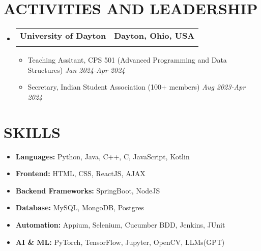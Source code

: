 \documentclass[letterpaper,11pt]{article}
\makeatletter
\newcommand{\resumeItem}[1]{\item\small{{#1 \vspace{-3pt}}}}
\newcommand{\resumeSubheading}[4]{\vspace{-2pt}\item\begin{tabular*}{0.97\textwidth}[t]{l@{\extracolsep{\fill}}r}\textbf{#1} & #2 \\\textit{\small#3} & \textit{\small #4} \\\end{tabular*}\vspace{-7pt}}
\newcommand{\resumeSubHeadingListStart}{\begin{itemize}[leftmargin=0.15in, label={}]}
\newcommand{\resumeSubHeadingListEnd}{\end{itemize}}
\newcommand{\resumeItemListStart}{\begin{itemize}}
\newcommand{\resumeItemListEnd}{\end{itemize}\vspace{-5pt}}
\makeatother
\begin{document}
\section{{\fontsize{9pt}{20pt}\selectfont \textbf{ACTIVITIES AND LEADERSHIP}}}
\resumeSubHeadingListStart
\resumeSubheading{University of Dayton}{\textbf{Dayton, Ohio, USA}}{}{}
\vspace{-17pt}
\resumeItemListStart
\resumeItem{Teaching Assitant, CPS 501 (Advanced Programming and Data Structures)} \hfill \textit{Jan 2024-Apr 2024}
\resumeItem{Secretary, Indian Student Association (100+ members)} \hfill \textit{Aug 2023-Apr 2024}
\resumeItemListEnd
\resumeSubHeadingListEnd
\vspace{-18pt}

\section{{\fontsize{9pt}{20pt}\selectfont \textbf{SKILLS}}}
\resumeSubHeadingListStart
\resumeItem{\textbf{Languages:} Python, Java, C++, C, JavaScript, Kotlin}\vspace{-7pt}
\resumeItem{\textbf{Frontend:} HTML, CSS, ReactJS, AJAX}\vspace{-7pt}
\resumeItem{\textbf{Backend Frameworks:} SpringBoot, NodeJS}\vspace{-7pt}
\resumeItem{\textbf{Database:} MySQL, MongoDB, Postgres}\vspace{-7pt}
\resumeItem{\textbf{Automation:} Appium, Selenium, Cucumber BDD, Jenkins, JUnit}\vspace{-7pt}
\resumeItem{\textbf{AI \& ML:} PyTorch, TensorFlow, Jupyter, OpenCV, LLMs(GPT)}
\resumeSubHeadingListEnd
\vspace{-10pt}
\end{document}
